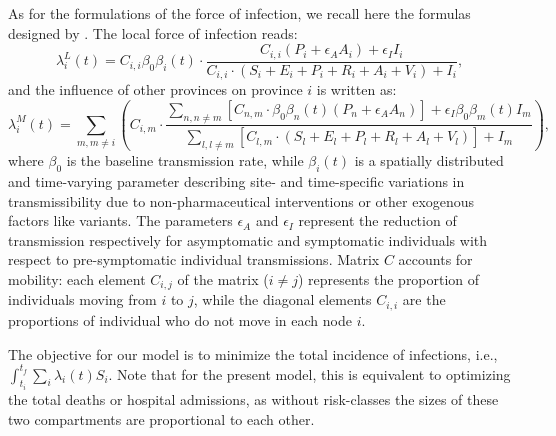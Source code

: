 As for the formulations of the force of infection, we recall here the formulas designed by \textcite{Gatto:SpreadDynamicsCOVID19:2020,Bertuzzo:GeographyCOVID19Spread:2020}. The local force of infection reads:
\begin{equation} 
     \lambda^L_i(t) = C_{i,i} \beta_{0}  \beta_i(t) \cdot \frac{C_{i,i}  (P_i + \epsilon_A  A_i) + \epsilon_I  I_i}{C_{i,i} \cdot (S_i + E_i + P_i + R_i + A_i + V_i) + I_i}, \label{eq:foiL}
\end{equation}
and the influence of other provinces on province $i$ is written as:
\begin{equation}
     \lambda^M_i(t) = \sum_{m, m \neq i} \left( 
     C_{i,m} \cdot 
     \frac{
     \sum_{n, n \neq m} \left[ C_{n,m} \cdot \beta_{0}  \beta_n(t)  (P_n + \epsilon_A  A_n) \right] + \epsilon_I  \beta_{0}  \beta_m(t)  I_m
     }
     {
     \sum_{l, l \neq m}  \left[C_{l, m} \cdot (S_l + E_l + P_l + R_l + A_l + V_l) \right] + I_m
     } 
     \right), \label{eq:foiM}
\end{equation}
where $\beta_{0}$ is the baseline transmission rate, while $\beta_{i}(t)$ is a spatially distributed and time-varying parameter describing site- and time-specific variations in transmissibility due to non-pharmaceutical interventions or other exogenous factors like variants. The parameters $\epsilon_A$ and $\epsilon_I$ represent the reduction of transmission respectively for asymptomatic and symptomatic individuals with respect to pre-symptomatic individual transmissions. Matrix $C$ accounts for mobility: each element $C_{i,j}$ of the matrix ($i \neq j$) represents the proportion of individuals moving from $i$ to $j$, while the diagonal elements $C_{i,i}$ are the proportions of individual who do not move in each node $i$.

The objective for our model is to minimize the total incidence of infections, i.e., $\int_{t_i}^{t_f} \sum_i \lambda_i(t) S_i$. Note that for the present model, this is equivalent to optimizing the total deaths or hospital admissions, as without risk-classes the sizes of these two compartments are proportional to each other.


